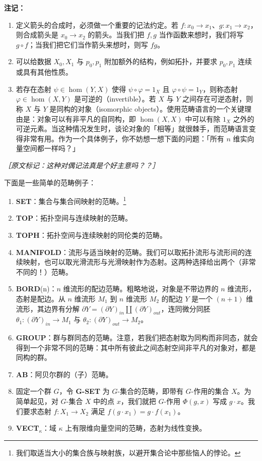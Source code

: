 \medskip
\textbf{注记：}

\begin{enumerate}
  \item 定义箭头的合成时，必须做一个重要的记法约定。若 $f:x_0\to x_1$、$g:x_1\to x_2$，则合成箭头是 $x_0\to x_2$ 的箭头。当我们把 $f,g$ 当作函数来想时，我们将写 $g\circ f$；当我们把它们当作箭头来想时，则写 $fg$。
  \item 可以给数据 $X_0,X_1$ 与 $p_0,p_1$ 附加额外的结构，例如拓扑，并要求 $p_0,p_1$ 连续或具有其他性质。
  \item 若存在态射 $\psi\in\hom(Y,X)$ 使得 $\psi\circ\varphi=1_X$ 且 $\varphi\circ\psi=1_Y$，则称态射 $\varphi\in\hom(X,Y)$ 是可逆的（invertible）。若 $X$ 与 $Y$ 之间存在可逆态射，则称 $X$ 与 $Y$ 是同构的对象（isomorphic objects）。使用范畴语言的一个关键理由是：对象可以有非平凡的自同构，即 $\hom(X,X)$ 中可以有除 $1_X$ 之外的可逆元素。当这种情况发生时，谈论对象的「相等」就很棘手，而范畴语言变得非常有用。作为一个具体例子，你不妨想一想下面的问题：「所有 $n$ 维实向量空间都一样吗？」
\end{enumerate}

{\small\itshape ［原文标记：这种对偶记法真是个好主意吗？？］}

下面是一些简单的范畴例子：

\begin{enumerate}
  \item \textbf{SET}：集合与集合间映射的范畴。\footnote{我们取适当大小的集合族与映射族，以避开集合论中那些恼人的悖论。}
  \item \textbf{TOP}：拓扑空间与连续映射的范畴。
  \item \textbf{TOPH}：拓扑空间与连续映射的同伦类的范畴。
  \item \textbf{MANIFOLD}：流形与适当映射的范畴。我们可以取拓扑流形与流形间的连续映射，也可以取光滑流形与光滑映射作为态射。这两种选择给出两个（非常不同的！）范畴。
  \item \textbf{BORD}(n)：$n$ 维流形的配边范畴。粗略地说，对象是不带边界的 $n$ 维流形，态射是配边。从 $n$ 维流形 $M_1$ 到 $n$ 维流形 $M_2$ 的配边 $Y$ 是一个 $(n+1)$ 维流形，其边界有分解 $\partial Y=(\partial Y)_{in}\amalg(\partial Y)_{out}$，连同微分同胚 $\theta_1:(\partial Y)_{in}\to M_1$ 与 $\theta_2:(\partial Y)_{out}\to M_2$。
  \item \textbf{GROUP}：群与群同态的范畴。注意，若我们把态射取为同构而非同态，就会得到一个非常不同的范畴：其中所有彼此之间态射空间非平凡的对象对，都是同构的群。
  \item \textbf{AB}：阿贝尔群的（子）范畴。
  \item 固定一个群 $G$，令 \textbf{G-SET} 为 $G$-集合的范畴，即带有 $G$-作用的集合 $X$。为简单起见，对 $G$-集合 $X$ 中的点 $x$，我们就把 $G$-作用 $\Phi(g,x)$ 写成 $g\cdot x$。我们要求态射 $f:X_1\to X_2$ 满足 $f(g\cdot x_1)=g\cdot f(x_1)$。
  \item \textbf{VECT}$_\kappa$：域 $\kappa$ 上有限维向量空间的范畴，态射为线性变换。
\end{enumerate}

